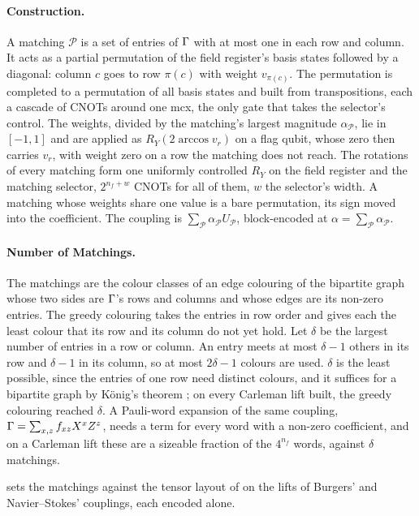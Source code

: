 \paragraph{Construction.} A matching $\mathcal{P}$ is a set of entries of $\Gamma$ with at most one in each row and column. It acts as a partial permutation of the field register's basis states followed by a diagonal: column $c$ goes to row $\pi(c)$ with weight $v_{\pi(c)}$. The permutation is completed to a permutation of all basis states and built from transpositions, each a cascade of CNOTs around one \gls{mcx}, the only gate that takes the selector's control. The weights, divided by the matching's largest magnitude $\alpha_{\mathcal P}$, lie in $[-1,1]$ and are applied as $R_Y(2\arccos v_r)$ on a flag qubit, whose zero then carries $v_r$, with weight zero on a row the matching does not reach. The rotations of every matching form one uniformly controlled $R_Y$ on the field register and the matching selector, $2^{n_f+w}$ CNOTs for all of them, $w$ the selector's width. A matching whose weights share one value is a bare permutation, its sign moved into the coefficient. The coupling is $\sum_{\mathcal P}\alpha_{\mathcal P}U_{\mathcal P}$, block-encoded at $\alpha=\sum_{\mathcal P}\alpha_{\mathcal P}$.

\paragraph{Number of Matchings.} The matchings are the colour classes of an edge colouring of the bipartite graph whose two sides are $\Gamma$'s rows and columns and whose edges are its non-zero entries. The greedy colouring takes the entries in row order and gives each the least colour that its row and its column do not yet hold. Let $\delta$ be the largest number of entries in a row or column. An entry meets at most $\delta-1$ others in its row and $\delta-1$ in its column, so at most $2\delta-1$ colours are used. $\delta$ is the least possible, since the entries of one row need distinct colours, and it suffices for a bipartite graph by K\"onig's theorem \cite{konig1916graphen}; on every Carleman lift built, the greedy colouring reached $\delta$. A Pauli-word expansion of the same coupling, $\Gamma=\sum_{x,z}f_{xz}X^xZ^z$, needs a term for every word with a non-zero coefficient, and on a Carleman lift these are a sizeable fraction of the $4^{n_f}$ words, against $\delta$ matchings.

 sets the matchings against the tensor layout of  on the lifts of Burgers' and Navier--Stokes' couplings, each encoded alone.

